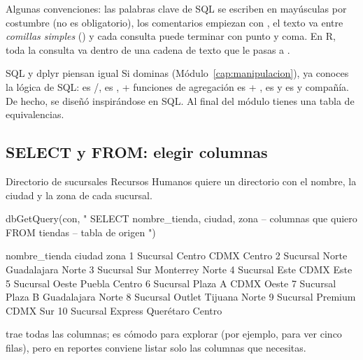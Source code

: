 Algunas convenciones: las palabras clave de SQL se escriben en mayúsculas
por costumbre (no es obligatorio), los comentarios empiezan con
\codigo{-{}-}, el texto va entre \emph{comillas simples}
() y cada consulta puede terminar con punto y coma. En R,
toda la consulta va dentro de una cadena de texto que le pasas a
.

\begin{concepto}{SQL y dplyr piensan igual}
Si dominas  (Módulo~\ref{cap:manipulacion}), ya conoces la
lógica de SQL:  es /,
 es ,  +
funciones de agregación es  + ,
 es  y  es
 y compañía. De hecho,  se diseñó
inspirándose en SQL. Al final del módulo tienes una tabla de equivalencias.
\end{concepto}

\subsection{SELECT y FROM: elegir columnas}

\begin{ejemplo}{Directorio de sucursales}
Recursos Humanos quiere un directorio con el nombre, la ciudad y la zona de
cada sucursal.
\end{ejemplo}

\begin{rcode}
dbGetQuery(con, "
  SELECT nombre_tienda, ciudad, zona   -- columnas que quiero
  FROM tiendas                         -- tabla de origen
")
\end{rcode}

\begin{rsalida}
      nombre_tienda      ciudad   zona
1   Sucursal Centro        CDMX Centro
2    Sucursal Norte Guadalajara  Norte
3      Sucursal Sur   Monterrey  Norte
4     Sucursal Este        CDMX   Este
5    Sucursal Oeste      Puebla Centro
6  Sucursal Plaza A        CDMX  Oeste
7  Sucursal Plaza B Guadalajara  Norte
8   Sucursal Outlet     Tijuana  Norte
9  Sucursal Premium        CDMX    Sur
10 Sucursal Express   Querétaro Centro
\end{rsalida}

{\sloppy {} trae todas las columnas; es cómodo para explorar (por
ejemplo,  para ver cinco filas),
pero en reportes conviene listar solo las columnas que necesitas.\par}

